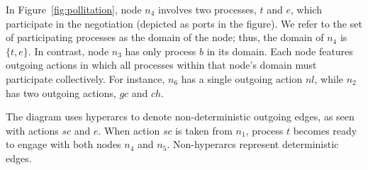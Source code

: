 In Figure~\ref{fig:pollitation}, node $n_4$ involves two processes, $t$ and $e$, which participate in the negotiation (depicted as ports in the figure). We refer to the set of participating processes as the domain of the node; thus, the domain of $n_4$ is $\{t, e\}$. In contrast, node $n_3$ has only process $b$ in its domain. Each node features outgoing actions in which all processes within that node's domain must participate collectively. For instance, $n_6$ has a single outgoing action $nl$, while $n_2$ has two outgoing actions, $gc$ and $ch$.

The diagram uses hyperarcs to denote non-deterministic outgoing edges, as seen with actions $sc$ and $e$. When action $sc$ is taken from $n_1$, process $t$ becomes ready to engage with both nodes $n_4$ and $n_5$. Non-hyperarcs represent deterministic edges. 

